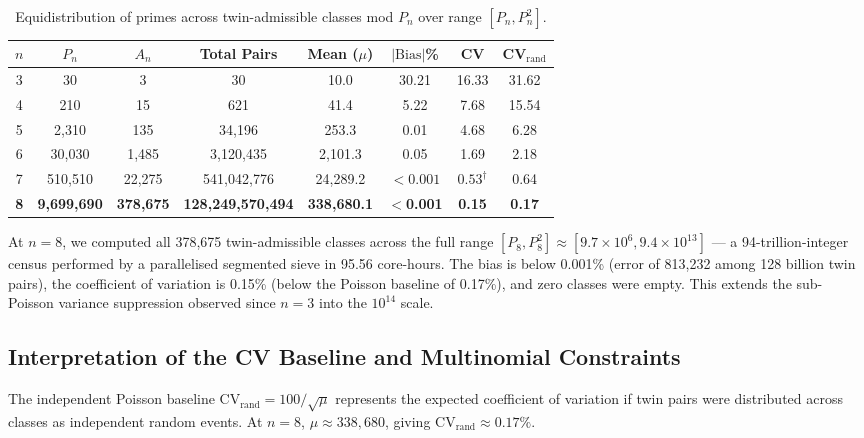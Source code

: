\documentclass[11pt]{article}
\begin{document}
\begin{table}[h]
\centering
\caption{Equidistribution of primes across twin-admissible classes mod $P_n$ over range $[P_n, P_n^2]$.}
\label{tab:numerical}
\begin{tabular}{cccccccc}
\toprule
$n$ & $P_n$ & $A_n$ & Total Pairs & Mean ($\mu$) & $|\text{Bias}|$\% & CV & CV$_{\text{rand}}$ \\
\midrule
3 & 30 & 3 & 30 & 10.0 & 30.21 & 16.33 & 31.62 \\
4 & 210 & 15 & 621 & 41.4 & 5.22 & 7.68 & 15.54 \\
5 & 2{,}310 & 135 & 34{,}196 & 253.3 & 0.01 & 4.68 & 6.28 \\
6 & 30{,}030 & 1{,}485 & 3{,}120{,}435 & 2{,}101.3 & 0.05 & 1.69 & 2.18 \\
7 & 510{,}510 & 22{,}275 & 541{,}042{,}776 & 24{,}289.2 & $<0.001$ & $0.53^{\dagger}$ & 0.64 \\
\textbf{8} & \textbf{9{,}699{,}690} & \textbf{378{,}675} & \textbf{128{,}249{,}570{,}494} & \textbf{338{,}680.1} & \textbf{$<$0.001} & \textbf{0.15} & \textbf{0.17} \\
\bottomrule
\end{tabular}

\vspace{0.5em}
\end{table}

\noindent At $n=8$, we computed all 378{,}675 twin-admissible classes across the full range $[P_8, P_8^2] \approx [9.7 \times 10^6, 9.4 \times 10^{13}]$ --- a 94-trillion-integer census performed by a parallelised segmented sieve in 95.56 core-hours. The bias is below 0.001\% (error of 813{,}232 among 128 billion twin pairs), the coefficient of variation is 0.15\% (below the Poisson baseline of 0.17\%), and zero classes were empty. This extends the sub-Poisson variance suppression observed since $n=3$ into the $10^{14}$ scale.

\subsection{Interpretation of the CV Baseline and Multinomial Constraints}

The independent Poisson baseline CV$_{\text{rand}} = 100/\sqrt{\mu}$ represents the expected coefficient of variation if twin pairs were distributed across classes as independent random events. At $n=8$, $\mu \approx 338{,}680$, giving CV$_{\text{rand}} \approx 0.17\%$. 
\end{document}

